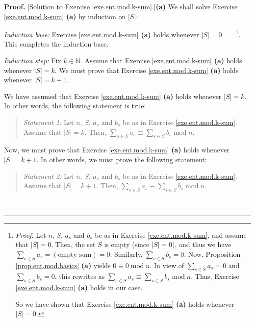 \documentclass[numbers=enddot,12pt,final,onecolumn,notitlepage]{scrartcl}%
\numberwithin{exer}{subsection}
\theoremstyle{definition}
\newenvironment{statement}{\begin{quote}}{\end{quote}}
\newenvironment{fineprint}{\begin{small}}{\end{small}}
\newenvironment{proof}[1][Proof]{\noindent\textbf{#1.} }{\ \rule{0.5em}{0.5em}}
\let\sumnonlimits\sum
\renewcommand{\sum}{\sumnonlimits\limits}
\begin{document}
\begin{fineprint}
\begin{proof}
[Solution to Exercise \ref{exe.ent.mod.k-sum}.]\textbf{(a)} We shall solve
Exercise \ref{exe.ent.mod.k-sum} \textbf{(a)} by induction on $\left\vert
S\right\vert $:

\textit{Induction base:} Exercise \ref{exe.ent.mod.k-sum} \textbf{(a)} holds
whenever $\left\vert S\right\vert =0$\ \ \ \ \footnote{\textit{Proof.} Let
$n$, $S$, $a_{s}$ and $b_{s}$ be as in Exercise \ref{exe.ent.mod.k-sum}, and
assume that $\left\vert S\right\vert =0$. Then, the set $S$ is empty (since
$\left\vert S\right\vert =0$), and thus we have $\sum_{s\in S}a_{s}=\left(
\text{empty sum}\right)  =0$. Similarly, $\sum_{s\in S}b_{s}=0$. Now,
Proposition \ref{prop.ent.mod.basics} \textbf{(a)} yields $0\equiv
0\operatorname{mod}n$. In view of $\sum_{s\in S}a_{s}=0$ and $\sum_{s\in
S}b_{s}=0$, this rewrites as $\sum_{s\in S}a_{s}\equiv\sum_{s\in S}%
b_{s}\operatorname{mod}n$. Thus, Exercise \ref{exe.ent.mod.k-sum} \textbf{(a)}
holds in our case.
\par
So we have shown that Exercise \ref{exe.ent.mod.k-sum} \textbf{(a)} holds
whenever $\left\vert S\right\vert =0$.}. This completes the induction base.

\textit{Induction step:} Fix $k\in\mathbb{N}$. Assume that Exercise
\ref{exe.ent.mod.k-sum} \textbf{(a)} holds whenever $\left\vert S\right\vert
=k$. We must prove that Exercise \ref{exe.ent.mod.k-sum} \textbf{(a)} holds
whenever $\left\vert S\right\vert =k+1$.

We have assumed that Exercise \ref{exe.ent.mod.k-sum} \textbf{(a)} holds
whenever $\left\vert S\right\vert =k$. In other words, the following statement
is true:

\begin{statement}
\textit{Statement 1:} Let $n$, $S$, $a_{s}$ and $b_{s}$ be as in Exercise
\ref{exe.ent.mod.k-sum}. Assume that $\left\vert S\right\vert =k$. Then,
$\sum_{s\in S}a_{s}\equiv\sum_{s\in S}b_{s}\operatorname{mod}n$.
\end{statement}

Now, we must prove that Exercise \ref{exe.ent.mod.k-sum} \textbf{(a)} holds
whenever $\left\vert S\right\vert =k+1$. In other words, we must prove the
following statement:

\begin{statement}
\textit{Statement 2:} Let $n$, $S$, $a_{s}$ and $b_{s}$ be as in Exercise
\ref{exe.ent.mod.k-sum}. Assume that $\left\vert S\right\vert =k+1$. Then,
$\sum_{s\in S}a_{s}\equiv\sum_{s\in S}b_{s}\operatorname{mod}n$.
\end{statement}


\end{proof}
\end{fineprint}
\end{document}
